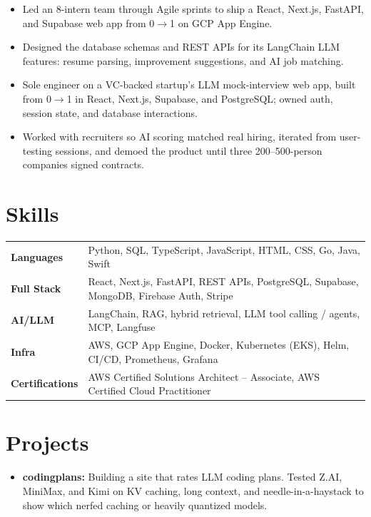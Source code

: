 \documentclass[11pt, letterpaper]{article}
\begin{document}
\vspace{1pt}
\begin{itemize}
  \item Led an 8-intern team through Agile sprints to ship a React, Next.js, FastAPI, and Supabase web app from 0$\to$1 on GCP App Engine.
  \item Designed the database schemas and REST APIs for its LangChain LLM features: resume parsing, improvement suggestions, and AI job matching.
\end{itemize}

\vspace{1pt}
\begin{itemize}
  \item Sole engineer on a VC-backed startup's LLM mock-interview web app, built from 0$\to$1 in React, Next.js, Supabase, and PostgreSQL; owned auth, session state, and database interactions.
  \item Worked with recruiters so AI scoring matched real hiring, iterated from user-testing sessions, and demoed the product until three 200--500-person companies signed contracts.
\end{itemize}

\section{Skills}
\begin{tabularx}{\textwidth}{@{}l @{\hspace{7pt}} >{\raggedright\arraybackslash}X@{}}
  \textbf{Languages} & Python, SQL, TypeScript, JavaScript, HTML, CSS, Go, Java, Swift \\[1pt]
  \textbf{Full Stack} & React, Next.js, FastAPI, REST APIs, PostgreSQL, Supabase, MongoDB, Firebase Auth, Stripe \\[1pt]
  \textbf{AI/LLM} & LangChain, RAG, hybrid retrieval, LLM tool calling / agents, MCP, Langfuse \\[1pt]
  \textbf{Infra} & AWS, GCP App Engine, Docker, Kubernetes (EKS), Helm, CI/CD, Prometheus, Grafana \\[1pt]
  \textbf{Certifications} & AWS Certified Solutions Architect -- Associate, AWS Certified Cloud Practitioner \\
\end{tabularx}

\section{Projects}
\begin{itemize}
  \item \textbf{codingplans:} Building a site that rates LLM coding plans. Tested Z.AI, MiniMax, and Kimi on KV caching, long context, and needle-in-a-haystack to show which nerfed caching or heavily quantized models.
\end{itemize}
\end{document}
